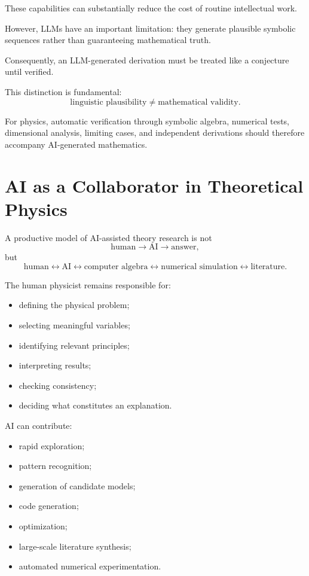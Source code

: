 \documentclass[11pt,a4paper]{article}
\begin{document}
These capabilities can substantially reduce the cost of routine intellectual
work.

However, LLMs have an important limitation: they generate plausible symbolic
sequences rather than guaranteeing mathematical truth.

Consequently, an LLM-generated derivation must be treated like a conjecture
until verified.

This distinction is fundamental:
\begin{equation}
\boxed{
\text{linguistic plausibility}\neq\text{mathematical validity}.
}
\end{equation}

For physics, automatic verification through symbolic algebra, numerical tests,
dimensional analysis, limiting cases, and independent derivations should
therefore accompany AI-generated mathematics.

\section{AI as a Collaborator in Theoretical Physics}

A productive model of AI-assisted theory research is not
\begin{equation}
\text{human}\rightarrow\text{AI}\rightarrow\text{answer},
\end{equation}
but
\begin{equation}
\text{human}
\leftrightarrow
\text{AI}
\leftrightarrow
\text{computer algebra}
\leftrightarrow
\text{numerical simulation}
\leftrightarrow
\text{literature}.
\end{equation}

The human physicist remains responsible for:

\begin{itemize}
\item defining the physical problem;
\item selecting meaningful variables;
\item identifying relevant principles;
\item interpreting results;
\item checking consistency;
\item deciding what constitutes an explanation.
\end{itemize}

AI can contribute:

\begin{itemize}
\item rapid exploration;
\item pattern recognition;
\item generation of candidate models;
\item code generation;
\item optimization;
\item large-scale literature synthesis;
\item automated numerical experimentation.
\end{itemize}
\end{document}
